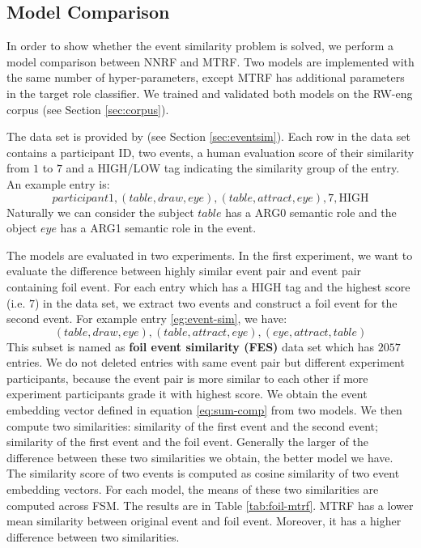 \documentclass[a4paper]{article}
\begin{document}
\subsection{Model Comparison} \label{sec:comp_mtrf}
In order to show whether the event similarity problem is solved, we perform a model comparison between NNRF and MTRF. Two models are implemented with the same number of hyper-parameters, except MTRF has additional parameters in the target role classifier. We trained and validated both models on the RW-eng corpus (see Section \ref{sec:corpus}). 

The data set is provided by \citet{grefenstette2015concrete} (see Section \ref{sec:eventsim}). Each row in the data set contains a participant ID, two events, a human evaluation score of their similarity from $1$ to $7$ and a HIGH/LOW tag indicating the similarity group of the entry. An example entry is:
\begin{equation} \label{eg:event-sim}
    participant1, (table, draw, eye), (table, attract, eye), 7, \text{HIGH}
\end{equation}
Naturally we can consider the subject $table$ has a ARG0 semantic role and the object $eye$ has a ARG1 semantic role in the event.

The models are evaluated in two experiments. In the first experiment, we want to evaluate the difference between highly similar event pair and event pair containing foil event. For each entry which has a HIGH tag and the highest score (i.e. $7$) in the data set, we extract two events and construct a foil event for the second event. For example entry \eqref{eg:event-sim}, we have:
\begin{equation}
    (table, draw, eye), (table, attract, eye), (eye, attract, table)
\end{equation}
This subset is named as \textbf{foil event similarity (FES)} data set  which has $2057$ entries. We do not deleted entries with same event pair but different experiment participants, because the event pair is more similar to each other if more experiment participants grade it with highest score. We obtain the event embedding vector defined in equation  \eqref{eq:sum-comp} from two models. We then compute two similarities: similarity of the first event and the second event; similarity of the first event and the foil event. Generally the larger of the difference between these two similarities we obtain, the better model we have. The similarity score of two events is computed as cosine similarity of two event embedding vectors. For each model, the means of these two similarities are computed across FSM. The results are in Table \ref{tab:foil-mtrf}. MTRF has a lower mean similarity between original event and foil event. Moreover, it has a higher difference between two similarities. 
\end{document}
